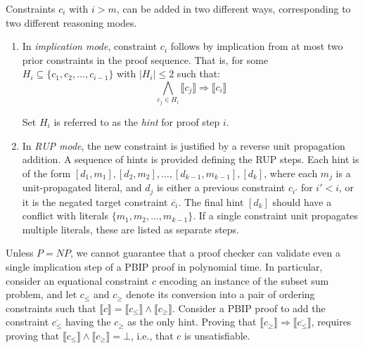 \documentclass{fmcad}
\begin{document}
Constraints $c_i$ with $i > m$, can be added in two different ways, corresponding to two
different reasoning modes.

\begin{enumerate}
\item In \textit{implication mode}, constraint $c_i$ follows by implication from at most two prior
  constraints in the proof sequence. That is, for some $H_i \subseteq \{c_1, c_2, \dots, c_{i - 1}\}$
  with $|H_i| \leq 2$ such that:
  \begin{equation}
    \label{eq:clausal-hints}
    \bigwedge_{c_j \in H_i} \llbracket c_j \rrbracket \Rightarrow \llbracket c_i \rrbracket
  \end{equation}

  Set $H_i$  is referred to as the \textit{hint} for proof step $i$.
\item In \textit{RUP mode}, the new constraint is justified by a reverse unit propagation addition.
  A sequence of hints is provided defining the RUP steps. Each hint is of the form $[d_1, m_1],
  [d_2, m_2], \dots, [d_{k - 1}, m_{k - 1}], [d_k]$, where each $m_j$ is a unit-propagated literal,
  and $d_j$ is either a previous constraint $c_{i'}$ for $i' < i$, or it is the negated target
  constraint $\overline{c_i}$. The final hint $[d_k]$ should have a conflict with literals
  $\{m_1, m_2, \dots, m_{k - 1}\}$. If a single constraint unit propagates multiple literals,
  these are listed as separate steps.
\end{enumerate}

Unless $P = NP$, we cannot guarantee that a proof checker can validate even a single implication
step of a PBIP proof in polynomial time. In particular, consider an equational constraint $c$
encoding an instance of the subset sum problem, and let $c_{\leq}$ and $c_{\geq}$ denote its conversion
into a pair of ordering constraints such that $\llbracket c \rrbracket = \llbracket c_{\leq}
\rrbracket \land \llbracket c_\geq \rrbracket$. Consider a PBIP proof to add the constraint
$\overline{c_{\leq}}$ having the $c_{\geq}$ as the only hint. Proving that
$\llbracket c_\geq \rrbracket \Rightarrow \llbracket \overline{c_\leq} \rrbracket$, requires proving
that $\llbracket c_\leq \rrbracket \land \llbracket c_\geq \rrbracket = \bot$, i.e., that
$c$ is unsatisfiable.
\end{document}
